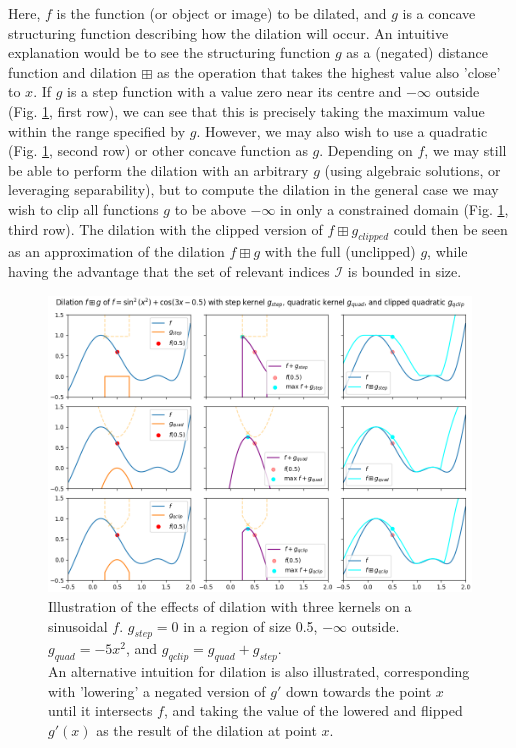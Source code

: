 \documentclass[11pt]{article} %
\begin{document}
Here, $f$ is the function (or object or image) to be dilated, and $g$ is a concave structuring function describing how the dilation will occur. An intuitive explanation would be to see the structuring function $g$ as a (negated) distance function and dilation $\boxplus$ as the operation that takes the highest value also 'close' to $x$. If $g$ is a step function with a value zero near its centre and $-\infty$ outside (Fig. \ref{fig:dil-illust}, first row), we can see that this is precisely taking the maximum value within the range specified by $g$. However, we may also wish to use a quadratic (Fig. \ref{fig:dil-illust}, second row) or other concave function as $g$. Depending on $f$, we may still be able to perform the dilation with an arbitrary $g$ (using algebraic solutions, or leveraging separability), but to compute the dilation in the general case we may wish to clip all functions $g$ to be above $-\infty$ in only a constrained domain (Fig. \ref{fig:dil-illust}, third row). The dilation with the clipped version of $f\boxplus g_{clipped}$ could then be seen as an approximation of the dilation $f\boxplus g$ with the full (unclipped) $g$, while having the advantage that the set of relevant indices $\mathcal{I}$ is bounded in size.

\begin{figure}[h!]
  \includegraphics[width=\textwidth]{figures/dilation_illustration.png}
  \caption{Illustration of the effects of dilation with three kernels on a sinusoidal $f$. $g_{step}=0$ in a region of size 0.5, $-\infty$ outside. $g_{quad}=-5x^2$, and $g_{qclip}=g_{quad}+g_{step}$. \\An alternative intuition for dilation is also illustrated, corresponding with 'lowering' a negated version of $g'$ down towards the point $x$ until it intersects $f$, and taking the value of the lowered and flipped $g'(x)$ as the result of the dilation at point $x$.}
  \label{fig:dil-illust}
\end{figure}
\end{document}
